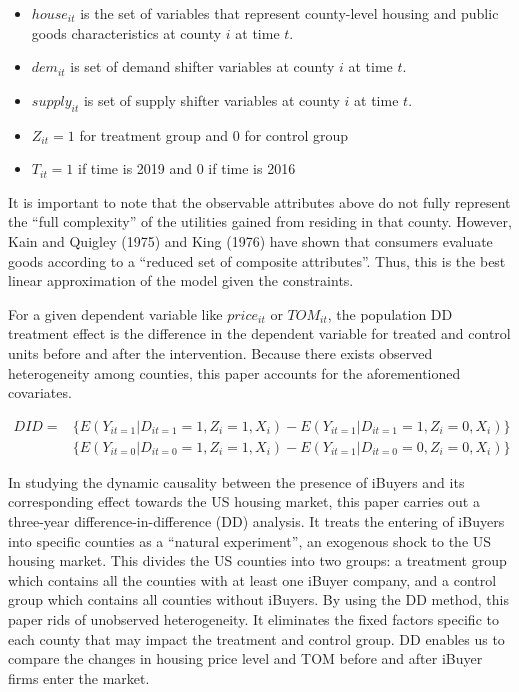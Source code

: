 \begin{itemize}

    \item $house_{it}$ is the set of variables that represent county-level housing and public goods characteristics at county $i$ at time $t$.

    \item $dem_{it}$ is set of demand shifter variables at county $i$ at time $t$.

    \item $supply_{it}$ is set of supply shifter variables at county $i$ at time $t$.

    \item $Z_{it}= 1$ for treatment group and 0 for control group

    \item $T_{it}= 1$ if time is 2019 and 0 if time is 2016

\end{itemize}

It is important to note that the observable attributes above do not fully represent the “full complexity” of the utilities gained from residing in that county. However, Kain and Quigley (1975) \cite{KQ} and King (1976) \cite{King} have shown that consumers evaluate goods according to a “reduced set of composite attributes”. Thus, this is the best linear approximation of the model given the constraints.  

For a given dependent variable like $price_{it}$ or $TOM_{it}$, the population DD treatment effect is the difference in the dependent variable for treated and control units before and after the intervention. Because there exists observed heterogeneity among counties, this paper accounts for the aforementioned covariates.

\begin{align}
    DID =& \{ E(Y_{it=1} | D_{it=1} = 1, Z_i = 1, X_i) - E(Y_{it=1} | D_{it=1} = 1,Z_i = 0, X_i)    \} \\
         & \{ E(Y_{it=0} | D_{it=0} = 1, Z_i = 1, X_i) - E(Y_{it=1} | D_{it=0} = 0,Z_i = 0, X_i)    \}
\end{align}

In studying the dynamic causality between the presence of iBuyers and its corresponding effect towards the US housing market, this paper carries out a three-year difference-in-difference (DD) analysis. It treats the entering of iBuyers into specific counties as a “natural experiment”, an exogenous shock to the US housing market. This divides the US counties into two groups: a treatment group which contains all the counties with at least one iBuyer company, and a control group which contains all counties without iBuyers. By using the DD method, this paper rids of unobserved heterogeneity. It eliminates the fixed factors specific to each county that may impact the treatment and control group. DD enables us to compare the changes in housing price level and TOM before and after iBuyer firms enter the market.  


